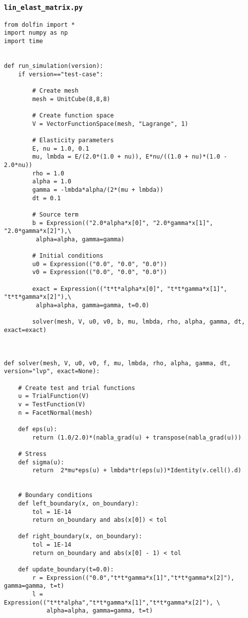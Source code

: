 \documentclass[twoside]{article}
\begin{document}
\subsubsection{\texttt{lin\_elast\_matrix.py}}
\label{time:dependent:matrix:code}
\begin{verbatim}
from dolfin import *
import numpy as np
import time


def run_simulation(version):
	if version=="test-case":

		# Create mesh
		mesh = UnitCube(8,8,8)

		# Create function space
		V = VectorFunctionSpace(mesh, "Lagrange", 1)

		# Elasticity parameters
		E, nu = 1.0, 0.1
		mu, lmbda = E/(2.0*(1.0 + nu)), E*nu/((1.0 + nu)*(1.0 - 2.0*nu))
		rho = 1.0
		alpha = 1.0
		gamma = -lmbda*alpha/(2*(mu + lmbda))
		dt = 0.1

		# Source term
		b = Expression(("2.0*alpha*x[0]", "2.0*gamma*x[1]", "2.0*gamma*x[2]"),\
		 alpha=alpha, gamma=gamma)

		# Initial conditions
		u0 = Expression(("0.0", "0.0", "0.0"))
		v0 = Expression(("0.0", "0.0", "0.0"))

		exact = Expression(("t*t*alpha*x[0]", "t*t*gamma*x[1]", "t*t*gamma*x[2]"),\
		 alpha=alpha, gamma=gamma, t=0.0)

		solver(mesh, V, u0, v0, b, mu, lmbda, rho, alpha, gamma, dt, exact=exact)



def solver(mesh, V, u0, v0, f, mu, lmbda, rho, alpha, gamma, dt, version="lvp", exact=None):
	
	# Create test and trial functions
	u = TrialFunction(V)
	v = TestFunction(V)
	n = FacetNormal(mesh)

	def eps(u):
		return (1.0/2.0)*(nabla_grad(u) + transpose(nabla_grad(u)))

	# Stress
	def sigma(u):
	 	return  2*mu*eps(u) + lmbda*tr(eps(u))*Identity(v.cell().d)


	# Boundary conditions
	def left_boundary(x, on_boundary):
		tol = 1E-14
		return on_boundary and abs(x[0]) < tol

	def right_boundary(x, on_boundary):
		tol = 1E-14
		return on_boundary and abs(x[0] - 1) < tol

	def update_boundary(t=0.0):
		r = Expression(("0.0","t*t*gamma*x[1]","t*t*gamma*x[2]"), gamma=gamma, t=t)
		l = Expression(("t*t*alpha","t*t*gamma*x[1]","t*t*gamma*x[2]"), \
			alpha=alpha, gamma=gamma, t=t)


\end{verbatim}
\end{document}
